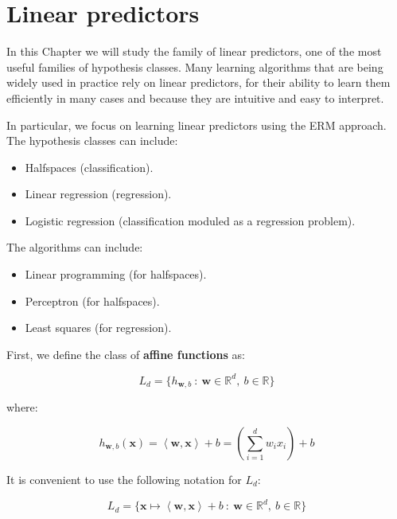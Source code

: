 \documentclass[../../main/main.tex]{subfiles}
\begin{document}
\chapter{Linear predictors}
In this Chapter we will study the family of linear predictors, one of the most useful families of hypothesis classes. Many learning algorithms that are being widely used in practice rely on linear predictors, for their ability to learn them efficiently in many cases and because they are intuitive and easy to interpret.

In particular, we focus on learning linear predictors using the ERM approach. The hypothesis classes can include:
\begin{itemize}
    \item Halfspaces (classification).
    \item Linear regression (regression).
    \item Logistic regression (classification moduled as a regression problem).
\end{itemize}

The algorithms can include:
\begin{itemize}
    \item Linear programming (for halfspaces).
    \item Perceptron (for halfspaces).
    \item Least squares (for regression).
\end{itemize}

First, we define the class of \textbf{affine functions} as:

\begin{equation}
    L_d = \{ h_{\mathbf{w},b} \ : \ \mathbf{w} \in \mathbb{R}^d, \ b \in \mathbb{R} \}
    \label{eq:C5_AF}
\end{equation}

where:

\begin{equation}
    h_{\mathbf{w},b} (\mathbf{x})
    =
    \left\langle \mathbf{w},\mathbf{x} \right\rangle + b
    =
    \left( \sum_{i=1}^{d} w_i x_i \right) + b
    \label{eq:C5_AFH}
\end{equation}

It is convenient to use the following notation for \( L_d \):

\begin{equation}
    L_d = \{ \mathbf{x} \mapsto \left\langle \mathbf{w}, \mathbf{x} \right\rangle + b \ : \ \mathbf{w} \in \mathbb{R}^d, \ b \in \mathbb{R} \}
    \label{eq:C5_AF_2}
\end{equation}
\end{document}
